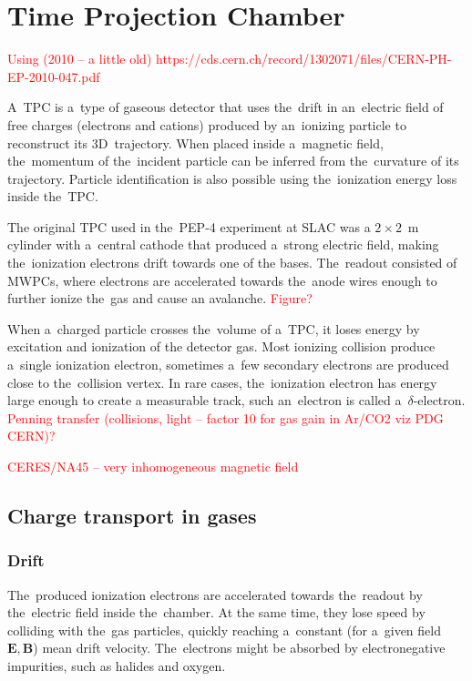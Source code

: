 \chapter{Time Projection Chamber}
\label{sec:tpc}
	\textcolor{red}{Using (2010 -- a little old) https://cds.cern.ch/record/1302071/files/CERN-PH-EP-2010-047.pdf}
	
	A~\acf{TPC} is a~type of gaseous detector that uses the~drift in an~electric field of free charges (electrons and cations) produced by an~ionizing particle to reconstruct its 3D~trajectory. When placed inside a~magnetic field, the~momentum of the~incident particle can be inferred from the~curvature of its trajectory. Particle identification is also possible using the~ionization energy loss inside the~\ac{TPC}.
	
	The original \ac{TPC} used in the~PEP-4 experiment at SLAC was a $2\times2$~m cylinder with a~central cathode that produced a~strong electric field, making the~ionization electrons drift towards one of the bases. The~readout consisted of \ac{MWPC}s, where electrons are accelerated towards the~anode wires enough to further ionize the~gas and cause an avalanche. \textcolor{red}{Figure?}
	
	When a~charged particle crosses the~volume of a~\ac{TPC}, it loses energy by excitation and ionization of the detector gas. Most ionizing collision produce a~single ionization electron, sometimes a~few secondary electrons are produced close to the~collision vertex. In rare cases, the~ionization electron has energy large enough to create a measurable track, such an~electron is called a~$\delta$\nobreakdash-electron. \textcolor{red}{Penning transfer (collisions, light -- factor 10 for gas gain in Ar/CO2 viz PDG CERN)?}
	
	\textcolor{red}{CERES/NA45 -- very inhomogeneous magnetic field}
	
	\section{Charge transport in gases}
		\subsection{Drift}
			The~produced ionization electrons are accelerated towards the~readout by the~electric field inside the~chamber. At the same time, they lose speed by colliding with the~gas particles, quickly reaching a~constant (for a~given field $\mathbf{E}, \mathbf{B}$) mean drift velocity. The~electrons might be absorbed by electronegative impurities, such as halides and oxygen.
			
